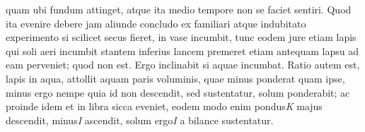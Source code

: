 quam ubi fundum attinget,%
atque ita medio tempore non se faciet sentiri.%
Quod ita evenire debere %
jam aliunde concludo%
\bracks{,}
ex familiari atque indubitato %
experimento%
%
\bracks{:}
si scilicet secus fieret,
in vase%
incumbit,
\ledpb%
tunc eodem jure etiam lapis%
qui soli aeri incumbit%
\bracks{,}
stantem inferius lancem%
premeret %
etiam antequam
lapsu
ad eam perveniet;
quod non est.
Ergo
inclinabit
si aquae incumbat.
Ratio autem est,%
lapis in aqua,%
%
attollit aquam paris voluminis,%
quae minus ponderat quam ipse,
minus ergo nempe
quia id
non descendit,
sed sustentatur,
solum ponderabit;
ac proinde
idem et in libra sicca%
eveniet,
eodem modo enim
pondus\;\textit{K} majus descendit,
minus\;\textit{I} ascendit,
solum ergo\;\textit{I} a bilance%
sustentatur.
\pend%
%
\frenchspacing%
\normalsize%
